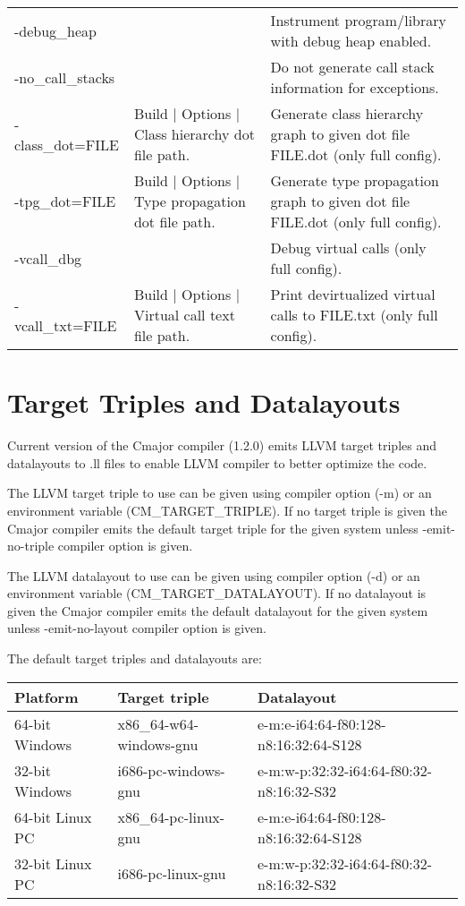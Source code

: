 \documentclass[oneside, a4paper, 11pt]{article}
\begin{document}
\begin{table}[htb]
\begin{tabular}{lp{5cm}p{5cm}}
-debug\_heap & & Instrument program/library with debug heap enabled.\\
-no\_call\_stacks & & Do not generate call stack information for exceptions.\\
-class\_dot=FILE & Build $|$ Options $|$ Class hierarchy dot file path. & Generate class hierarchy graph to given dot file FILE.dot (only full config).\\
-tpg\_dot=FILE & Build $|$ Options $|$ Type propagation dot file path. & Generate type propagation graph to given dot file FILE.dot (only full config).\\
-vcall\_dbg & & Debug virtual calls (only full config).\\
-vcall\_txt=FILE & Build $|$ Options $|$ Virtual call text file path. & Print devirtualized virtual calls to FILE.txt (only full config).\\
\end{tabular}
\end{table}

\section{Target Triples and Datalayouts}

Current version of the Cmajor compiler (1.2.0) emits LLVM target triples and datalayouts to .ll files
to enable LLVM compiler to better optimize the code.

The LLVM target triple to use can be given using compiler option (-m) or an environment variable (CM\_TARGET\_TRIPLE).
If no target triple is given the Cmajor compiler emits the default target triple for the given system unless
-emit-no-triple compiler option is given.

The LLVM datalayout to use can be given using compiler option (-d) or an environment variable (CM\_TARGET\_DATALAYOUT).
If no datalayout is given the Cmajor compiler emits the default datalayout for the given system unless
-emit-no-layout compiler option is given.

The default target triples and datalayouts are:

\begin{tabular}{lll}
\textbf{Platform} & \textbf{Target triple} & \textbf{Datalayout}\\
\hline
64-bit Windows & x86\_64-w64-windows-gnu & e-m:e-i64:64-f80:128-n8:16:32:64-S128\\
32-bit Windows & i686-pc-windows-gnu & e-m:w-p:32:32-i64:64-f80:32-n8:16:32-S32\\
64-bit Linux PC & x86\_64-pc-linux-gnu & e-m:e-i64:64-f80:128-n8:16:32:64-S128\\
32-bit Linux PC & i686-pc-linux-gnu & e-m:w-p:32:32-i64:64-f80:32-n8:16:32-S32\\
\end{tabular}
\end{document}
